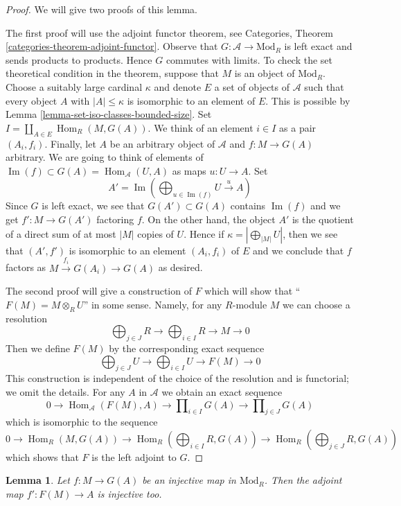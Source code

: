 \documentclass{stacks-project}
\theoremstyle{plain}
\newtheorem{lemma}[subsection]{Lemma}
\theoremstyle{definition}
\theoremstyle{remark}
\numberwithin{equation}{subsection}
\def\Hom{\mathop{\mathrm{Hom}}\nolimits}
\def\Im{\mathop{\mathrm{Im}}}
\begin{document}
\begin{proof}
We will give two proofs of this lemma.

\medskip\noindent
The first proof will use the adjoint functor theorem, see
Categories, Theorem \ref{categories-theorem-adjoint-functor}.
Observe that $G : \mathcal{A} \to \text{Mod}_R$ is left exact and sends
products to products. Hence $G$ commutes with limits. To check the set
theoretical condition in the theorem, suppose that $M$ is an object of
$\text{Mod}_R$. Choose a suitably large cardinal $\kappa$ and denote $E$
a set of objects of $\mathcal{A}$ such that every object $A$ with
$|A| \leq \kappa$ is isomorphic to an element of $E$. This is possible
by Lemma \ref{lemma-set-iso-classes-bounded-size}. Set
$I = \coprod_{A \in E} \Hom_R(M, G(A))$.
We think of an element $i \in I$ as a pair $(A_i, f_i)$.
Finally, let $A$ be an arbitrary object of $\mathcal{A}$
and $f : M \to G(A)$ arbitrary. We are going to think of
elements of $\Im(f) \subset G(A) = \Hom_\mathcal{A}(U, A)$
as maps $u : U \to A$. Set
$$
A' = \Im(\bigoplus\nolimits_{u \in \Im(f)} U \xrightarrow{u} A)
$$
Since $G$ is left exact, we see that $G(A') \subset G(A)$
contains $\Im(f)$ and we get $f' : M \to G(A')$ factoring $f$.
On the other hand, the object $A'$ is
the quotient of a direct sum of at most $|M|$ copies of $U$.
Hence if $\kappa = |\bigoplus_{|M|} U|$, then we see that $(A', f')$
is isomorphic to an element $(A_i, f_i)$ of $E$ and we conclude that $f$
factors as $M \xrightarrow{f_i} G(A_i) \to G(A)$ as desired.

\medskip\noindent
The second proof will give a construction of $F$ which will show
that ``$F(M) = M \otimes_R U$'' in some sense. Namely, for any
$R$-module $M$ we can choose a resolution
$$
\bigoplus\nolimits_{j \in J} R \to
\bigoplus\nolimits_{i \in I} R \to
M \to 0
$$
Then we define $F(M)$ by the corresponding exact sequence
$$
\bigoplus\nolimits_{j \in J} U \to
\bigoplus\nolimits_{i \in I} U \to
F(M) \to 0
$$
This construction is independent of the choice of the resolution
and is functorial; we omit the details.
For any $A$ in $\mathcal{A}$ we obtain an exact sequence
$$
0 \to \Hom_\mathcal{A}(F(M), A) \to
\prod\nolimits_{i \in I} G(A) \to
\prod\nolimits_{j \in J} G(A)
$$
which is isomorphic to the sequence
$$
0 \to \Hom_R(M, G(A)) \to
\Hom_R(\bigoplus\nolimits_{i \in I} R, G(A)) \to
\Hom_R(\bigoplus\nolimits_{j \in J} R, G(A))
$$
which shows that $F$ is the left adjoint to $G$.
\end{proof}

\begin{lemma}
\label{lemma-F-G-monos}
Let $f : M \to G(A)$ be an injective map in $\text{Mod}_R$.
Then the adjoint map $f' : F(M) \to A$ is injective too.
\end{lemma}
\end{document}

